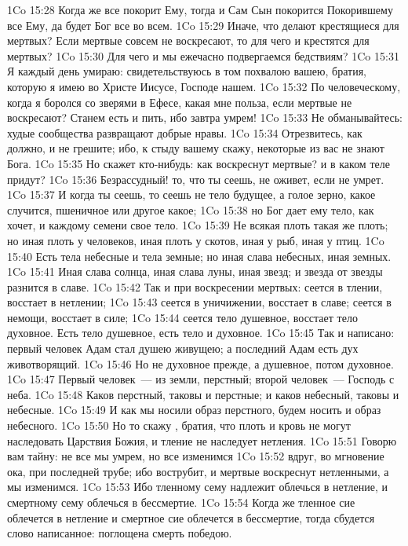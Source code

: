 \vs 1Co 15:28 Когда же все покорит Ему, тогда и Сам Сын покорится Покорившему все Ему, да будет Бог все во всем.
\vs 1Co 15:29 Иначе, что делают крестящиеся для мертвых? Если мертвые совсем не воскресают, то для чего и крестятся для мертвых?
\vs 1Co 15:30 Для чего и мы ежечасно подвергаемся бедствиям?
\vs 1Co 15:31 Я каждый день умираю: свидетельствуюсь в том похвалою вашею, братия, которую я имею во Христе Иисусе, Господе нашем.
\vs 1Co 15:32 По  человеческому, когда я боролся со зверями в Ефесе, какая мне польза, если мертвые не воскресают? Станем есть и пить, ибо завтра умрем!
\vs 1Co 15:33 Не обманывайтесь: худые сообщества развращают добрые нравы.
\vs 1Co 15:34 Отрезвитесь, как должно, и не грешите; ибо, к стыду вашему скажу, некоторые из вас не знают Бога.
\rsbpar\vs 1Co 15:35 Но скажет кто-нибудь: как воскреснут мертвые? и в каком теле придут?
\vs 1Co 15:36 Безрассудный! то, что ты сеешь, не оживет, если не умрет.
\vs 1Co 15:37 И когда ты сеешь, то сеешь не тело будущее, а голое зерно, какое случится, пшеничное или другое какое;
\vs 1Co 15:38 но Бог дает ему тело, как хочет, и каждому семени свое тело.
\vs 1Co 15:39 Не всякая плоть такая же плоть; но иная плоть у человеков, иная плоть у скотов, иная у рыб, иная у птиц.
\vs 1Co 15:40 Есть тела небесные и тела земные; но иная слава небесных, иная земных.
\vs 1Co 15:41 Иная слава солнца, иная слава луны, иная звезд; и звезда от звезды разнится в славе.
\vs 1Co 15:42 Так и при воскресении мертвых: сеется в тлении, восстает в нетлении;
\vs 1Co 15:43 сеется в уничижении, восстает в славе; сеется в немощи, восстает в силе;
\vs 1Co 15:44 сеется тело душевное, восстает тело духовное. Есть тело душевное, есть тело и духовное.
\vs 1Co 15:45 Так и написано: первый человек Адам стал душею живущею; а последний Адам есть дух животворящий.
\vs 1Co 15:46 Но не духовное прежде, а душевное, потом духовное.
\vs 1Co 15:47 Первый человек~--- из земли, перстный; второй человек~--- Господь с неба.
\vs 1Co 15:48 Каков перстный, таковы и перстные; и каков небесный, таковы и небесные.
\vs 1Co 15:49 И как мы носили образ перстного, будем носить и образ небесного.
\rsbpar\vs 1Co 15:50 Но то скажу , братия, что плоть и кровь не могут наследовать Царствия Божия, и тление не наследует нетления.
\vs 1Co 15:51 Говорю вам тайну: не все мы умрем, но все изменимся
\vs 1Co 15:52 вдруг, во мгновение ока, при последней трубе; ибо вострубит, и мертвые воскреснут нетленными, а мы изменимся.
\vs 1Co 15:53 Ибо тленному сему надлежит облечься в нетление, и смертному сему облечься в бессмертие.
\vs 1Co 15:54 Когда же тленное сие облечется в нетление и смертное сие облечется в бессмертие, тогда сбудется слово написанное: поглощена смерть победою.
